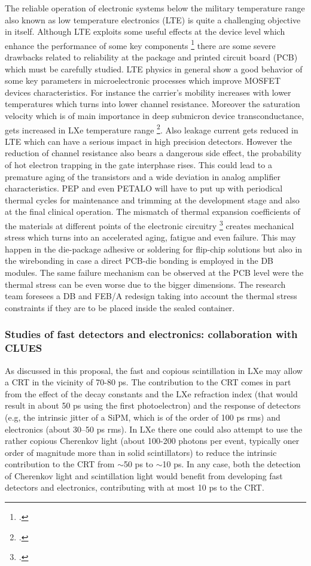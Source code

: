 The reliable operation of electronic systems below the military temperature range also known as low temperature electronics (LTE) is quite a challenging objective in itself. Although LTE exploits some useful effects at the device level which enhance the performance of some key components \footcite{fast_lte_dram} there are some severe drawbacks related to reliability at the package and printed circuit board (PCB) which must be carefully studied.
LTE physics in general show a good behavior of some key parameters in microelectronic processes which improve MOSFET devices characteristics. For instance the carrier's mobility increases with lower temperatures which turns into lower channel resistance. Moreover the saturation velocity which is of main importance in deep submicron device transconductance, gets increased in LXe temperature range \footcite{sat_velocity}. Also leakage current gets reduced in LTE which can have a serious impact in high precision detectors. However the reduction of channel resistance also bears a dangerous side effect, the probability of hot electron trapping in the gate interphase rises. This could lead to a premature aging of the transistors and a wide deviation in analog amplifier characteristics. 
PEP and even PETALO will have to put up with periodical thermal cycles for maintenance and trimming at the development stage and also at the final clinical operation. The mismatch of thermal expansion coefficients of the materials at different points of the electronic circuitry \footcite{lau2012thermal} creates mechanical stress which turns into an accelerated aging, fatigue and even failure. This may happen in the die-package adhesive or soldering for flip-chip solutions but also in the wirebonding in case a direct PCB-die bonding is employed in the DB modules. The same failure mechanism can be observed at the PCB level were the thermal stress can be even worse due to the bigger dimensions. The research team foresees a DB and FEB/A redesign taking into account the thermal stress constraints if they are to be placed inside the sealed container.

\subsubsection*{Studies of fast detectors and electronics: collaboration with CLUES}

As discussed in this proposal, the fast and copious scintillation in LXe may allow a CRT in the vicinity of 70-80 ps. The contribution to the CRT comes in part from the effect of the decay constants and the LXe refraction index (that would result in about 50 ps using the first photoelectron) and the response of detectors (e.g, the intrinsic jitter of a SiPM, which is of the order of 100 ps rms) and electronics (about 30--50 ps rms). In LXe there one could also attempt to use the rather copious Cherenkov light (about 100-200 photons per event, typically oner order of magnitude more than in solid scintillators) to reduce the intrinsic contribution to the CRT from $\sim$50 ps to  $\sim$10 ps. In any case, both the detection of Cherenkov light and scintillation light would benefit from developing fast detectors and electronics, contributing with at most 10 ps to the CRT.

